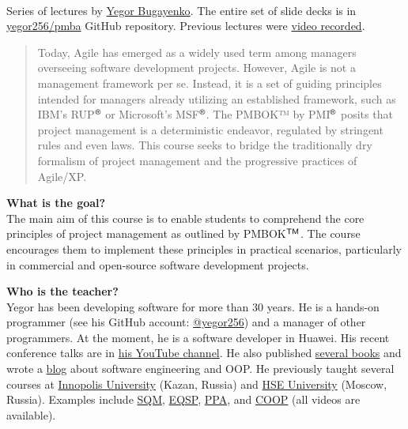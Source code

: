 \documentclass[nobrand,anonymous,nodate,nosecurity]{huawei}
\newcommand\REG{$^{\tiny{\textsf{\textregistered}}}$}
\newcommand\TM{$^{\tiny{\textsf{TM}}}$}
\begin{document}
{\\
Series of lectures by \href{https://www.yegor256.com}{Yegor Bugayenko}.
The entire set of slide decks is in \href{https://github.com/yegor256/pmba}{yegor256/pmba} GitHub repository.
Previous lectures were \href{https://www.youtube.com/playlist?list=PLaIsQH4uc08x_T-Aelduv3Zf0DWRx40pq}{video recorded}.

\begin{abstract}
Today, Agile has emerged as a widely used term among managers overseeing software development projects.
However, Agile is not a management framework per se.
Instead, it is a set of guiding principles intended for managers already utilizing an established framework, such as IBM's RUP\REG{} or Microsoft's MSF\REG{}.
The PMBOK™ by PMI\REG{} posits that project management is a deterministic endeavor, regulated by stringent rules and even laws.
This course seeks to bridge the traditionally dry formalism of project management and the progressive practices of Agile/XP.
\end{abstract}

\textbf{What is the goal?}\\
The main aim of this course is to enable students to comprehend the core principles of project management as outlined by PMBOK\TM{}.
The course encourages them to implement these principles in practical scenarios, particularly in commercial and open-source software development projects.

\textbf{Who is the teacher?}\\
Yegor has been developing software for more than 30 years.
He is a hands-on programmer (see his GitHub account: \href{https://github.com/yegor256}{@yegor256}) and a manager of other programmers.
At the moment, he is a software developer in Huawei.
His recent conference talks are in \href{https://www.youtube.com/channel/UCr9qCdqXLm2SU0BIs6d_68Q}{his YouTube channel}.
He also published \href{https://www.yegor256.com/books.html}{several books} and wrote a \href{https://www.yegor256.com/contents.html}{blog} about software engineering and OOP.
He previously taught several courses at \href{https://innopolis.university/}{Innopolis University} (Kazan, Russia) and \href{https://hse.ru}{HSE University} (Moscow, Russia). Examples include \href{https://github.com/yegor256/sqm}{SQM}, \href{https://github.com/yegor256/eqsp}{EQSP}, \href{https://github.com/yegor256/ppa}{PPA}, and \href{https://github.com/yegor256/painofoop}{COOP} (all videos are available).

}
\end{document}
